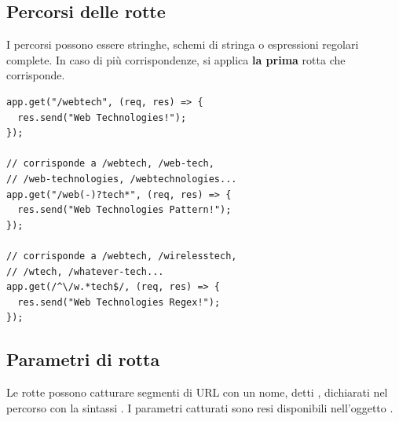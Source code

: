 \subsection{Percorsi delle rotte}

I percorsi possono essere stringhe, schemi di stringa o espressioni regolari
complete. In caso di più corrispondenze, si applica \textbf{la prima} rotta che
corrisponde.

\begin{affianco}[0.58][c]
\begin{lstlisting}[style=js, name=routes.js]
app.get("/webtech", (req, res) => {
  res.send("Web Technologies!");
});

// corrisponde a /webtech, /web-tech,
// /web-technologies, /webtechnologies...
app.get("/web(-)?tech*", (req, res) => {
  res.send("Web Technologies Pattern!");
});

// corrisponde a /webtech, /wirelesstech,
// /wtech, /whatever-tech...
app.get(/^\/w.*tech$/, (req, res) => {
  res.send("Web Technologies Regex!");
});
\end{lstlisting}
\risultato
\begin{immagine}
\end{immagine}
\end{affianco}

\subsection{Parametri di rotta}

Le rotte possono catturare segmenti di URL con un nome, detti ,
dichiarati nel percorso con la sintassi . I parametri
catturati sono resi disponibili nell'oggetto .

